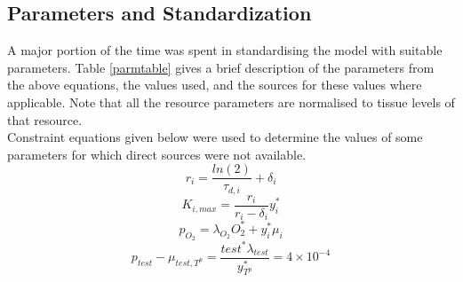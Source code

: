 \documentclass[a4paper]{article}
\begin{document}
\subsection{Parameters and Standardization}
A major portion of the time was spent in standardising the model with suitable parameters. Table \ref{parmtable} gives a brief description of the parameters from the above equations, the values used, and the sources for these values where applicable. Note that all the resource parameters are normalised to tissue levels of that resource.\\
Constraint equations given below were used to determine the values of some parameters for which direct sources were not available.
\begin{equation}
  r_i = \frac{ln(2)}{\tau_{d,i}} + \delta_i
  \label{r_eq}
\end{equation}
\begin{equation}
  K_{i,max}=\frac{r_i}{r_i-\delta_i} y_i^*
  \label{rho_eq}
\end{equation}
\begin{equation}
  p_{O_2} = \lambda_{O_2} O_2^* + y_i^* \mu_i
  \label{p_o2_eq}
\end{equation}
\begin{equation}
  p_{test} - \mu_{test,T^p} = \frac{test^* \lambda_{test}}{y_{T^p}^*} = 4 \times 10^{-4}
  \label{p_test_eq}
\end{equation}
\end{document}
